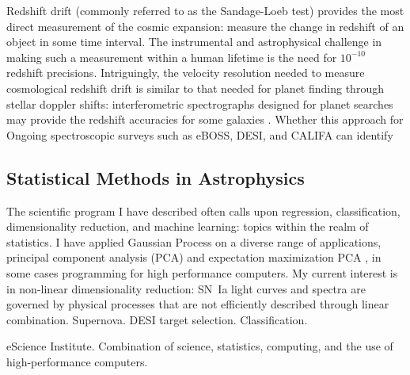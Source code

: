 \documentclass{article}
\begin{document}
Redshift drift (commonly referred to as the Sandage-Loeb test) provides the most direct  measurement
of the cosmic expansion: measure the change in redshift of an object in some time interval.  The instrumental
and astrophysical challenge
in making such a measurement within a human lifetime
is the need for $10^{-10}$ redshift precisions.  Intriguingly, the velocity resolution needed to measure
cosmological redshift drift is similar to that needed for planet finding through stellar doppler shifts:
interferometric spectrographs designed for planet searches may provide the redshift accuracies for some galaxies
\cite{drift}.
Whether this approach for 
Ongoing spectroscopic surveys such as eBOSS, DESI, and CALIFA can identify 

\subsection{Statistical Methods in Astrophysics}
The scientific program I have described often calls upon regression, classification, dimensionality reduction,
and machine learning: topics within the realm of statistics.  I have applied Gaussian Process
on a diverse range of applications, principal component
analysis (PCA) and expectation maximization PCA \cite{2012PhRvD..85l3530S,2013ApJ...766...84K,
2013PhRvD..87l3512H}, in some cases programming for high performance computers.
My current interest is in non-linear dimensionality reduction: SN~Ia light curves and spectra
are governed by physical processes that are not efficiently described through linear combination.
Supernova.  DESI target selection.  Classification.

eScience Institute.  Combination of science, statistics, computing, and the use of high-performance computers.
\end{document}
